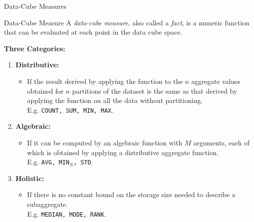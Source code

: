 \begin{frame}{Data-Cube Measures}
	\begin{block}{Data-Cube Measure}
		A \textit{data-cube measure}, also called a \textit{fact}, is a numeric
		function that can be evaluated at each point in the data cube space.
	\end{block}

	\textbf{Three Categories:}
	\begin{enumerate}
		\item {\color{faugray}\textbf{Distributive:}}
		      \begin{itemize}
			      \item If the result derived by applying the function to the $n$ aggregate values obtained for $n$ partitions of the dataset is the same as that derived by applying the function on all the data without partitioning.\\
			            E.g. \texttt{COUNT, SUM, MIN, MAX}.
		      \end{itemize}
		\item {\color{faugray}\textbf{Algebraic:}}
		      \begin{itemize}
			      \item If it can be computed by an algebraic function with $M$ arguments, each of which is obtained by applying a distributive aggregate function.\\
			            E.g. \texttt{AVG, MIN$_N$, STD}.
		      \end{itemize}
		\item {\color{faugray}\textbf{Holistic:}}
		      \begin{itemize}
			      \item If there is no constant bound on the storage size needed to describe a subaggregate.\\
			            E.g. \texttt{MEDIAN, MODE, RANK}.
		      \end{itemize}
	\end{enumerate}
\end{frame}

